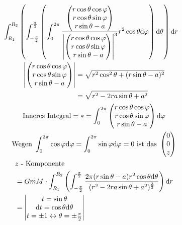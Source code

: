 \begin{bsp*}[note = Gravitation einer Kugelschale]
\begin{gather*}
\begin{split}
			&\int_{R_1}^{R_2} \left( \int_{-\frac{\pi}{2}}^{\frac{\pi}{2}} \left( \int_0^{2\pi} \frac{\begin{pmatrix} r \cos \theta \cos \varphi \\ r \cos \theta \sin \varphi \\ r \sin \theta - a \end{pmatrix}}{\abs{\begin{pmatrix} r \cos \theta \cos \varphi \\ r \cos \theta \sin \varphi \\ r \sin \theta - a \end{pmatrix}}^3} r^2 \cos \theta \dd \varphi \right) \dd \theta \right) \dd r
		\end{split} \\
		\begin{split}
			\abs{\begin{pmatrix} r \cos \theta \cos \varphi \\ r \cos \theta \sin \varphi \\ r \sin \theta - a \end{pmatrix}}
				&= \sqrt{r^2 \cos^2 \theta + (r \sin \theta - a)^2} \\
				&= \sqrt{r^2 - 2ra\sin\theta + a^2}
		\end{split} \\
		\text{Inneres Integral} = * = \int_0^{2\pi} \begin{pmatrix} r \cos \theta \cos \varphi \\ r \cos \theta \sin \varphi \\ r \sin \theta - a \end{pmatrix} \dd \varphi \\
		\text{Wegen } \int_0^{2\pi} \cos\varphi \dd \varphi = \int_0^{2\pi} \sin\varphi \dd \varphi = 0 \text{ ist das } \begin{pmatrix} 0 \\ 0 \\ z \end{pmatrix} \\
		\begin{split}
			&\text{$z$ - Komponente} \\
			&= GmM \cdot \int_{R_1}^{R_2} \left( \int_{-\frac{\pi}{2}}^{\frac{\pi}{2}} \frac{2\pi (r\sin\theta - a) r^2 \cos \theta \dd \theta}{(r^2 - 2ra\sin\theta  + a^2)^{\frac{3}{2}}} \right) \dd r \\
			&= \begin{vmatrix} t = \sin \theta \\ \dd t = \cos \theta \dd \theta \\ t = \pm 1 \leftrightarrow \theta = \pm \frac{\pi}{2} \end{vmatrix} \\

\end{split}
\end{gather*}
\end{bsp*}
